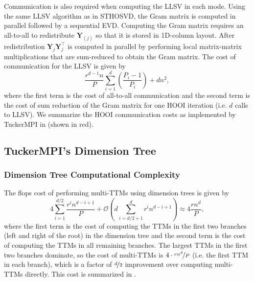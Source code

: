         Communication is also required when computing the LLSV in each mode.
        Using the same LLSV algorithm as in STHOSVD, the Gram matrix is computed
        in parallel followed by a sequential EVD. Computing the Gram matrix
        requires an all-to-all to redistribute $\mathbf{Y}_{(j)}$ so that it is
        stored in 1D-column layout. After redistribution
        $\mathbf{Y}_{j}\mathbf{Y}_{j}^\intercal$ is computed in parallel by
        performing local matrix-matrix multiplications that are sum-reduced to
        obtain the Gram matrix. The cost of communication for the LLSV is given
        by
        \begin{equation*}
            \frac{r^{d-1}n}{P} \sum_{i = 1}^{d}\left(\frac{P_i-1}{P_i}\right) + dn^2,
        \end{equation*}
        where the first term is the cost of all-to-all communication and the second term
        is the cost of sum reduction of the Gram matrix for one HOOI iteration (i.e. $d$
        calls to LLSV).
        We summarize the HOOI communication costs as implemented by TuckerMPI in  (shown in red).


\subsection{TuckerMPI's Dimension Tree}
    \subsubsection{Dimension Tree Computational Complexity}

        The flops cost of performing multi-TTMs using dimension trees is given by
        \begin{equation*}
            4 \sum_{i=1}^{d/2} \frac{r^i n^{d-i+1}}{P} + \mathcal{O} \left(d \sum_{i = d/2 + 1}^{d} r^i n^{d - i + 1}\right) \approx 4\frac{rn^d}{P},
        \end{equation*}
        where the first term is the cost of computing the TTMs in the first two branches
        (left and right of the root) in the dimension tree and the second term is the
        cost of computing the TTMs in all remaining branches. The largest TTMs in the
        first two branches dominate, so the cost of multi-TTMs is $4\cdot \nicefrac{rn^d}{P}$
        (i.e. the first TTM in each branch), which is a factor of $\nicefrac d2$ improvement over
        computing multi-TTMs directly. This cost is summarized in .
    
